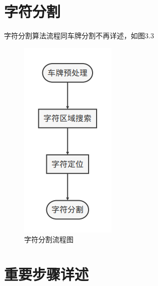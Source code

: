 \section{字符分割}
字符分割算法流程同车牌分割不再详述，如图3.3
\begin{figure}[h]
	\centering
	\includegraphics[scale=0.5]{figures/7.png}
	\caption{字符分割流程图}
	\label{fig:2}
\end{figure}

\section{重要步骤详述}
